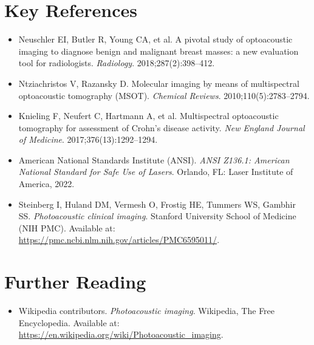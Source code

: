\section{Key References}
\begin{itemize}
  \item Neuschler EI, Butler R, Young CA, et al. A pivotal study of optoacoustic imaging to diagnose benign and malignant breast masses: a new evaluation tool for radiologists. \textit{Radiology}. 2018;287(2):398--412.
  \item Ntziachristos V, Razansky D. Molecular imaging by means of multispectral optoacoustic tomography (MSOT). \textit{Chemical Reviews}. 2010;110(5):2783--2794.
  \item Knieling F, Neufert C, Hartmann A, et al. Multispectral optoacoustic tomography for assessment of Crohn's disease activity. \textit{New England Journal of Medicine}. 2017;376(13):1292--1294.
  \item American National Standards Institute (ANSI). \textit{ANSI Z136.1: American National Standard for Safe Use of Lasers}. Orlando, FL: Laser Institute of America, 2022.
  \item Steinberg I, Huland DM, Vermesh O, Frostig HE, Tummers WS, Gambhir SS. \textit{Photoacoustic clinical imaging}. Stanford University School of Medicine (NIH PMC). Available at: \url{https://pmc.ncbi.nlm.nih.gov/articles/PMC6595011/}.
\end{itemize}

\section{Further Reading}
\begin{itemize}
  \item Wikipedia contributors. \textit{Photoacoustic imaging}. Wikipedia, The Free Encyclopedia. Available at: \url{https://en.wikipedia.org/wiki/Photoacoustic_imaging}.
\end{itemize}
